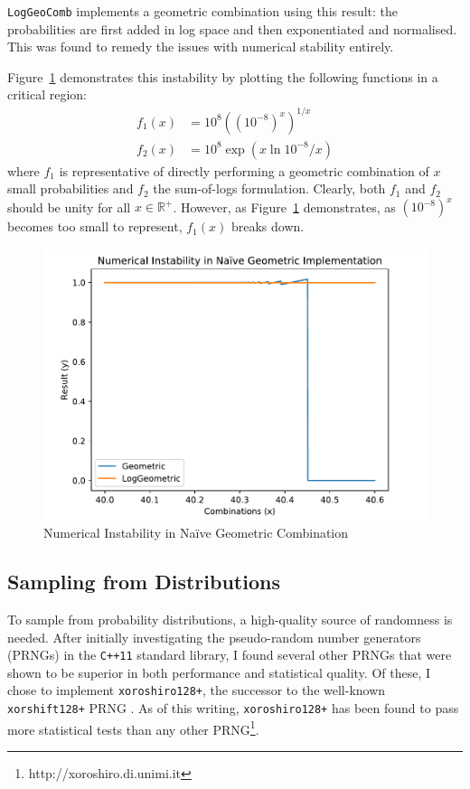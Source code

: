 \documentclass[12pt,a4paper,twoside,openright]{report}
\begin{document}
\texttt{LogGeoComb} implements a geometric combination using this result: the
probabilities are first added in log space and then exponentiated and
normalised. This was found to remedy the issues with numerical stability
entirely.

Figure~\ref{fig:num-instab} demonstrates this instability by plotting the
following functions in a critical region:
\begin{align*}
  f_1(x) &= 10^8 \left( \left( 10^{-8} \right)^x \right)^{1/x} \\
  f_2(x) &= 10^8 \exp( x \ln{10^{-8}} / x)
\end{align*}
where $f_1$ is representative of directly performing a geometric combination of
$x$ small probabilities and $f_2$ the sum-of-logs formulation. Clearly, both
$f_1$ and $f_2$ should be unity for all $x \in \mathbb{R}^+$. However, as
Figure~\ref{fig:num-instab} demonstrates, as $(10^{-8})^x$ becomes too small to
represent, $f_1(x)$ breaks down.

\begin{figure}[H]
\centering
\includegraphics[width=400pt]{figs/instability.pdf}
\caption{Numerical Instability in Naïve Geometric Combination}
\label{fig:num-instab}
\end{figure}

\subsection{Sampling from Distributions}

To sample from probability distributions, a high-quality source of randomness is
needed. After initially investigating the pseudo-random number generators
(PRNGs) in the \texttt{C++11} standard library, I found several other PRNGs that
were shown to be superior in both performance and statistical quality. Of these,
I chose to implement \texttt{xoroshiro128+}, the successor to the well-known
\texttt{xorshift128+} PRNG \cite{vigna2017further}.  As of this writing,
\texttt{xoroshiro128+} has been found to pass more statistical tests than any
other PRNG\footnote{http://xoroshiro.di.unimi.it}. 
\end{document}
